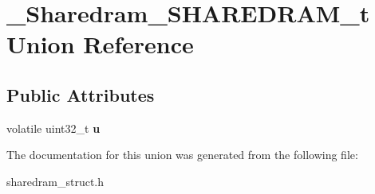 \hypertarget{union__Sharedram__SHAREDRAM__t}{\section{\-\_\-\-Sharedram\-\_\-\-S\-H\-A\-R\-E\-D\-R\-A\-M\-\_\-t Union Reference}
\label{union__Sharedram__SHAREDRAM__t}
}
\subsection*{Public Attributes}
\begin{DoxyCompactItemize}
\item 
\hypertarget{union__Sharedram__SHAREDRAM__t_ad344db39a770eb2f2ba9d0e608635f8d}{volatile uint32\-\_\-t {\bfseries u}}\label{union__Sharedram__SHAREDRAM__t_ad344db39a770eb2f2ba9d0e608635f8d}

\end{DoxyCompactItemize}


The documentation for this union was generated from the following file\-:\begin{DoxyCompactItemize}
\item 
sharedram\-\_\-struct.\-h\end{DoxyCompactItemize}
